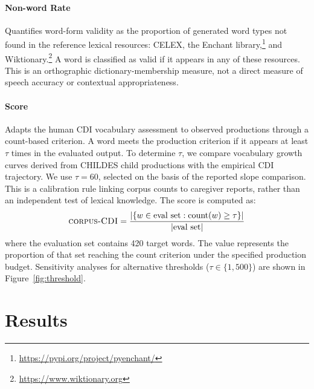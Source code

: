 \paragraph{Non-word Rate} Quantifies word-form validity as the proportion of generated word types not found in the reference lexical resources: CELEX, the Enchant library,\footnote{\url{https://pypi.org/project/pyenchant/}} and Wiktionary.\footnote{\url{https://www.wiktionary.org}} A word is classified as valid if it appears in any of these resources. This is an orthographic dictionary-membership measure, not a direct measure of speech accuracy or contextual appropriateness.


\paragraph{\meCDI{} Score} Adapts the human CDI vocabulary assessment to observed productions through a count-based criterion. A word meets the production criterion if it appears at least $\tau$ times in the evaluated output. To determine $\tau$, we compare vocabulary growth curves derived from CHILDES child productions with the empirical CDI trajectory. We use $\tau = 60$, selected on the basis of the reported slope comparison. This is a calibration rule linking corpus counts to caregiver reports, rather than an independent test of lexical knowledge. The \meCDI{} score is computed as:
$$
\text{\textsc{corpus-CDI}{}} = \frac{|\{w \in \text{eval set} : \text{count}(w) \geq \tau\}|}{|\text{eval set}|}
$$
where the evaluation set contains 420 target words. The value represents the proportion of that set reaching the count criterion under the specified production budget. Sensitivity analyses for alternative thresholds ($\tau \in \{1, 500\}$) are shown in Figure~\ref{fig:threshold}.





\section{Results}

